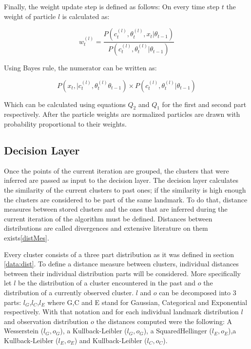 \documentclass [twoside,hidelinks]{article}
\begin{document}
Finally, the weight update step is defined as follows: On every time step $t$ the weight of particle $l$ is calculated as:

\begin{equation}
w_t^{ (l)} = \frac {P (c_t^{ (l)} , \theta_t^{ (l)}, x_t| 	\theta_{t-1} )}{P (c_t^{ (l)} , \theta_t^{ (l)}| 	\theta_{t-1} )}
\end{equation}

Using Bayes rule, the numerator can be written as:

\begin{equation}
	P (x_t , | c_t^{ (l)} , \theta_t^{ (l)} \theta_{t-1} ) \times P (c_t^{ (l)} , \theta_t^{ (l)}|  \theta_{t-1} )
\end{equation}

Which can be calculated using equations $Q_2$ and $Q_1$ for the first and second part respectively. After the particle weights are normalized particles are drawn with probability proportional to their weights.

\subsection{Decision Layer}

Once the points of the current iteration are grouped, the clusters that were inferred are passed as input to the decision layer. The decision layer calculates the similarity of the current clusters to past ones; if the similarity is high enough the clusters are considered to be part of the same landmark. To do that, distance measures between stored clusters and the ones that are inferred during the current iteration of the algorithm must be defined. Distances between distributions are called divergences and extensive literature on them exists\ref{distMes}.

Every cluster consists of a three part distribution as it was defined in section \ref{data:dist}. To define a distance measure between clusters, individual distances between their individual distribution parts will be considered. More specifically let $l$ be the distribution of a cluster encountered in the past and $o$ the distribution of a currently observed cluster. $l$ and $o$ can be decomposed into 3 parts: $l_G$,$l_C$,$l_E$ where G,C and E stand for Gaussian, Categorical and Exponential respectively. With that notation and for each individual landmark distribution $l$ and observation distribution $o$ the distances computed were the following: A Wesserstein ($l_G,o_G$), a Kullback-Leibler ($l_G,o_G$), a SquaredHellinger ($l_E,o_E$),a Kullback-Leibler ($l_E,o_E$) and  Kullback-Leibler ($l_C,o_C$).
\end{document}
